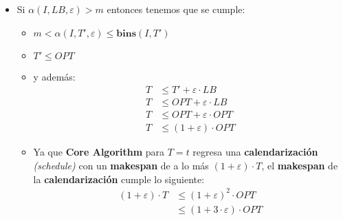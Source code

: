 \begin{frame}{\subsectiontitle}
    \begin{itemize}
        \item Si \(\alpha\left(I, LB, \varepsilon\right) > m\) entonces tenemos que se cumple:
        \begin{itemize}
            \item \(m < \alpha\left(I, T', \varepsilon\right) \leq \mathbf{bins}\left(I, T'\right)\)
            \item \(T' \leq OPT\)
            \item y además:
            \begin{align*}
                T &\leq T' + \varepsilon \cdot LB \\
                T &\leq OPT + \varepsilon \cdot LB \\
                T &\leq OPT + \varepsilon \cdot OPT \\
                T &\leq (1 + \varepsilon) \cdot OPT
            \end{align*}
            \item Ya que \textbf{Core Algorithm} para \(T = t\) regresa una \textbf{calendarización} \textit{(schedule)}
            con un \textbf{makespan} de a lo más \((1 + \varepsilon) \cdot T\), el \textbf{makespan} de la 
            \textbf{calendarización} cumple lo siguiente:
            \begin{align*}
                (1 + \varepsilon) \cdot T &\leq  (1 + \varepsilon)^2 \cdot OPT \\
                                          &\leq  (1 + 3 \cdot \varepsilon) \cdot OPT
            \end{align*}
        \end{itemize}
    \end{itemize}
\end{frame}